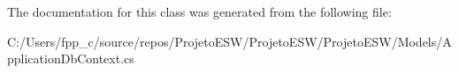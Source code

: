 The documentation for this class was generated from the following file\+:\begin{DoxyCompactItemize}
\item 
C\+:/\+Users/fpp\+\_\+c/source/repos/\+Projeto\+E\+S\+W/\+Projeto\+E\+S\+W/\+Projeto\+E\+S\+W/\+Models/Application\+Db\+Context.\+cs\end{DoxyCompactItemize}
